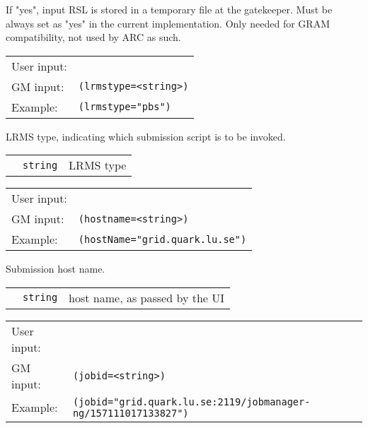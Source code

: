   If "yes", input RSL is stored in a temporary file at the
  gatekeeper. Must be always set as "yes" in the current implementation.
  Only needed for GRAM compatibility, not used by ARC as such.

  \hspace*{0.5cm}
  \begin{shaded}
  \end{shaded}
  \begin{tabular}{lp{13cm}}
    User input:&\verb##\\
    GM input:&\verb#(lrmstype=<string>)#\\
    Example:&\verb#(lrmstype="pbs")#\\
  \end{tabular}

  LRMS type, indicating which submission script is to be invoked. 

  \begin{tabular}{llp{10cm}}
    \hspace*{1cm}&\texttt{string} & LRMS type \\
  \end{tabular}

  \hspace*{0.5cm}
  \begin{shaded}
  \end{shaded}
  \begin{tabular}{lp{13cm}}
    User input:&\verb##\\
    GM input:&\verb#(hostname=<string>)#\\
    Example:&\verb#(hostName="grid.quark.lu.se")#\\
  \end{tabular}

  Submission host name. 

  \begin{tabular}{llp{10cm}}
    \hspace*{1cm}&\texttt{string} & host name, as passed by the UI\\
  \end{tabular}

  \hspace*{0.5cm}
  \begin{shaded}
  \end{shaded}
  \begin{tabular}{lp{13cm}}
    User input:&\verb##\\
    GM input:&\verb#(jobid=<string>)#\\
    Example:&\verb#(jobid="grid.quark.lu.se:2119/jobmanager-ng/157111017133827")#\\
  \end{tabular}

